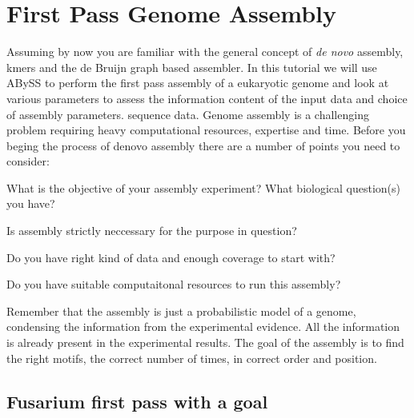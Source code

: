 
\newpage

\section{First Pass Genome Assembly}
\begin{information}
Assuming by now you are familiar with the general concept of \textit{de novo} assembly, kmers and the de Bruijn graph based assembler. In this tutorial we will use ABySS to perform  the first pass assembly of a eukaryotic genome and look at various parameters to assess the information content of the input data and choice of assembly parameters. 
sequence data. 
Genome assembly is a challenging problem requiring heavy computational resources, expertise and time. Before you beging the process of denovo assembly there are a number of points you need to consider:
\item What is the objective of your assembly experiment? What biological question(s) you have?
\item Is assembly strictly neccessary for the purpose in question?
\item Do you have right kind of data and enough coverage to start with?
\item Do you have suitable computaitonal resources to run this assembly?

\end{information}

\begin{note}
Remember that the assembly is just a probabilistic model of a genome, condensing the information 
from the experimental evidence.  All the information is already present in the 
experimental results. The goal of the assembly is to find the right motifs, 
the correct number of times, in correct order and position.
\end{note}


\subsection{Fusarium first pass with a goal}

